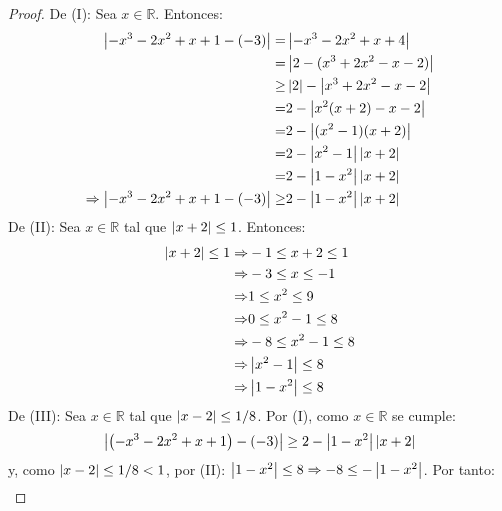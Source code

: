 \documentclass[12pt]{article}
\begin{document}
\begin{enumerate}
\begin{enumerate}
\begin{equation*}
        \end{equation*}
    \end{enumerate}
    \begin{proof}
        De (I): Sea $x\in\mathbb{R}$. Entonces:
        \begin{equation*}
            \begin{split}
                \left| -x^3-2x^2+x+1-(-3) \right|=&\left| -x^3-2x^2+x+4 \right|\\
                =&\left| 2-(x^3+2x^2-x-2) \right|\\
                \geq&\left| 2 \right|-\left| x^3+2x^2-x-2 \right|\\
                =&2-\left| x^2(x+2)-x-2 \right|\\
                =&2-\left| (x^2-1)(x+2) \right|\\
                =&2-\left| x^2-1 \right|\left| x+2 \right|\\
                =&2-\left| 1-x^2 \right|\left| x+2 \right|\\
                \Rightarrow\left| -x^3-2x^2+x+1-(-3) \right|\geq&2-\left| 1-x^2 \right|\left| x+2 \right|
            \end{split}
        \end{equation*}
        De (II): Sea $x\in\mathbb{R}$ tal que $\left| x+2 \right|\leq1$. Entonces:
        \begin{equation*}
            \begin{split}
                \left| x+2 \right|\leq1\Rightarrow&-1\leq x+2\leq1\\
                \Rightarrow&-3\leq x\leq-1\\
                \Rightarrow&1\leq x^2\leq9\\
                \Rightarrow&0\leq x^2-1\leq8\\
                \Rightarrow&-8\leq x^2-1\leq8\\
                \Rightarrow&\left| x^2-1 \right|\leq8\\
                \Rightarrow&\left| 1-x^2 \right|\leq8
            \end{split}
        \end{equation*}
        De (III): Sea $x\in\mathbb{R}$ tal que $\left| x-2 \right|\leq1/8$. Por (I), como $x\in\mathbb{R}$ se cumple:
        \begin{equation*}
            \left| \left(-x^3-2x^2+x+1\right)-\left(-3\right) \right|\geq2-\left| 1-x^2 \right|\left| x+2 \right|
        \end{equation*}
        y, como $\left| x-2 \right|\leq1/8<1$, por (II): $\left| 1-x^2 \right|\leq8\Rightarrow-8\leq-\left| 1-x^2 \right|$. Por tanto:
        \begin{equation*}
            \begin{split}

\end{split}
\end{equation*}
\end{proof}
\end{enumerate}
\end{document}
